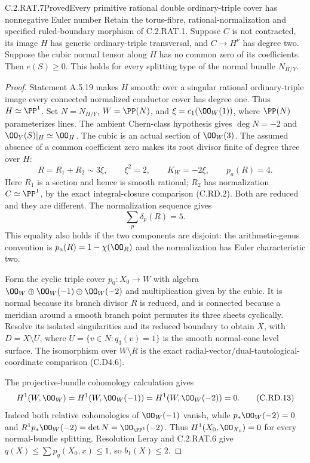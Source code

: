 \begin{statement}{C.2.RAT.7}{Proved}{Every primitive rational double ordinary-triple cover has nonnegative Euler number}
Retain the torus-fibre, rational-normalization and specified
ruled-boundary morphism of C.2.RAT.1. Suppose $C$ is not
contracted, its image $H$ has generic ordinary-triple
transversal, and $C\to H^\nu$ has degree two. Suppose
the cubic normal tensor along $H$ has no common zero of
its coefficients. Then $e(S)\ge0$. This holds for every
splitting type of the normal bundle $N_{H/Y}$.
\end{statement}
\begin{proof}
Statement A.5.19 makes $H$ smooth: over a singular
rational ordinary-triple image every connected normalized
conductor cover has degree one. Thus $H\simeq\PP^1$.
Set $N=N_{H/Y}$, $W=\PP(N)$, and
$\xi=c_1(\OO_W(1))$, where $\PP(N)$ parameterizes lines.
The ambient Chern-class hypothesis gives
$\deg N=-2$ and $\OO_Y(S)|_H\simeq\OO_H$.
The cubic is an actual section of $\OO_W(3)$.
The assumed absence of a common coefficient zero makes
its root divisor finite of degree three over $H$:
\[
 R=R_1+R_2\sim3\xi,\qquad
 \xi^2=2,\qquad K_W=-2\xi,\qquad p_a(R)=4.
\tag{C.RD.11}
\]
Here $R_1$ is a section and hence is smooth rational;
$R_2$ has normalization $C\simeq\PP^1$, by the exact
integral-closure comparison (C.RD.2). Both are reduced
and they are different. The normalization sequence gives
\[
                  \sum_p\delta_p(R)=5.
\tag{C.RD.12}
\]
This equality also holds if the two components are
disjoint: the arithmetic-genus convention is
$p_a(R)=1-\chi(\OO_R)$ and the normalization has Euler
characteristic two.

Form the cyclic triple cover
$p_0:X_0\to W$ with algebra
$\OO_W\oplus\OO_W(-1)\oplus\OO_W(-2)$ and multiplication
given by the cubic. It is normal because its branch
divisor $R$ is reduced, and is connected because a
meridian around a smooth branch point permutes its
three sheets cyclically. Resolve its isolated
singularities and its reduced boundary to obtain
$X$, with $D=X\setminus U$, where
$U=\{v\in N:q_3(v)=1\}$ is the smooth normal-cone
level surface. The isomorphism over $W\setminus R$
is the exact radial-vector/dual-tautological-coordinate
comparison (C.D4.6).

The projective-bundle cohomology calculation gives
\[
 H^1(W,\OO_W)=H^1(W,\OO_W(-1))
             =H^1(W,\OO_W(-2))=0.
\tag{C.RD.13}
\]
Indeed both relative cohomologies of $\OO_W(-1)$
vanish, while $p_*\OO_W(-2)=0$ and
$R^1p_*\OO_W(-2)=\det N=\OO_{\PP^1}(-2)$.
Thus $H^1(X_0,\OO_{X_0})=0$ for every normal-bundle
splitting. Resolution Leray and C.2.RAT.6 give
$q(X)\le\sum p_g(X_0,x)\le1$, so $b_1(X)\le2$.


\end{proof}
